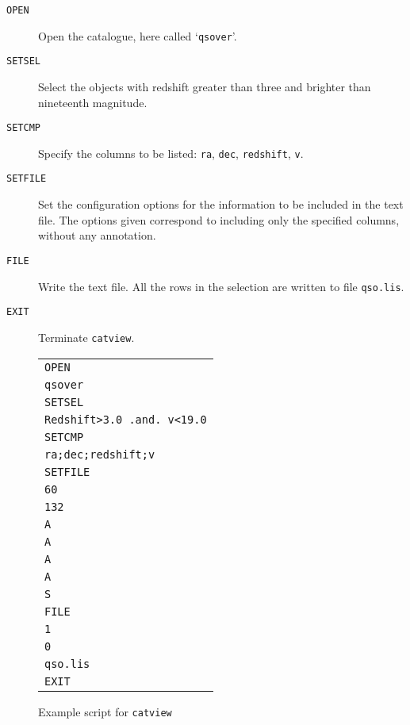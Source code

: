 \documentclass[twoside,11pt]{article}
\renewcommand{\_}{\texttt{\symbol{95}}}
\begin{document}
\begin{description}

  \item[ {\tt OPEN} ] Open the catalogue, here called `{\tt qsover}'.

  \item[ {\tt SETSEL} ] Select the objects with redshift greater than
   three and brighter than nineteenth magnitude.

  \item[ {\tt SETCMP} ] Specify the columns to be listed: {\tt ra},
   {\tt dec}, {\tt redshift}, {\tt v}.

  \item[ {\tt SETFILE} ] Set the configuration options for the
   information to be included in the text file.  The options given
   correspond to including only the specified columns, without any
   annotation.

  \item[ {\tt FILE} ] Write the text file.  All the rows in the
   selection are written to file {\tt qso.lis}.

  \item[ {\tt EXIT} ] Terminate {\tt catview}.

\end{description}

\begin{figure}[htbp]
\begin{center}

\begin{tabular}{l}
{\tt OPEN}                    \\
{\tt qsover}                  \\
{\tt SETSEL}                  \\
{\tt Redshift>3.0 .and. v<19.0} \\
{\tt SETCMP}                  \\
{\tt ra;dec;redshift;v}       \\
{\tt SETFILE}                 \\
{\tt 60}                      \\
{\tt 132}                     \\
{\tt A}                       \\
{\tt A}                       \\
{\tt A}                       \\
{\tt A}                       \\
{\tt S}                       \\
{\tt FILE}                    \\
{\tt 1}                       \\
{\tt 0}                       \\
{\tt qso.lis}                 \\
{\tt EXIT}                    \\
\end{tabular}

\caption{Example script for {\tt catview}\label{CATVIEW_SCRIPT} }

\end{center}
\end{figure}
\end{document}
